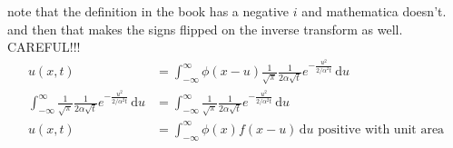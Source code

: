 \documentclass{article}
\begin{document}
note that the definition in the book has a negative $i$ and mathematica doesn't. and then that makes the signs flipped on the inverse transform as well. CAREFUL!!!
\begin{align*}
  u(x,t)&=\int_{-\infty}^{\infty}{\phi(x-u)\frac{1}{\sqrt{\pi}}\frac{1}{2\alpha \sqrt{t}}e^{-\frac{u^2}{2/\alpha ^2t}}\,\mathrm{d}u}\\
  \int_{-\infty}^{\infty}{\frac{1}{\sqrt{\pi}}\frac{1}{2\alpha \sqrt{t}}e^{-\frac{u^2}{2/\alpha ^2t}}\,\mathrm{d}u}&=\int_{-\infty}^{\infty}{\frac{1}{\sqrt{\pi}}\frac{1}{2\alpha \sqrt{t}}e^{-\frac{u^2}{2/\alpha ^2t}}\,\mathrm{d}u}\\
  u(x,t)&=\int_{-\infty}^\infty{\phi(x)f(x-u)\,\mathrm{d}u}\text{ positive with unit area}
\end{align*}
\end{document}
